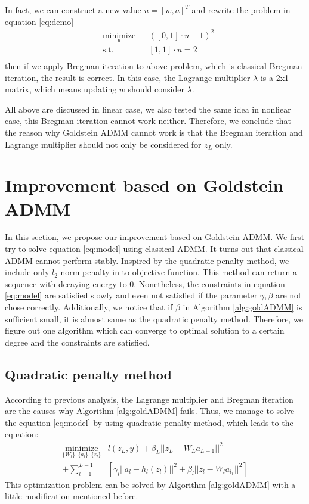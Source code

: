 \documentclass[letterpaper, 10 pt, conference]{ieeeconf}  %
\begin{document}
In fact, we can construct a new value $u = [w,a]^T$ and rewrite the problem in equation \eqref{eq:demo}
\begin{equation}
\begin{aligned}
& \underset{u}{\text{minimize}}  & & ([0,1]\cdot u-1)^2 \\
& \text{s.t.} & & [1,1] \cdot u = 2\\
\end{aligned}
\end{equation}
then if we apply Bregman iteration to above problem, which is classical Bregman iteration, the result is correct. In this case, the Lagrange multiplier $\lambda$ is a 2x1 matrix, which means updating $w$ should consider $\lambda$.

All above are discussed in linear case, we also tested the same idea in nonliear case, this Bregman iteration cannot work neither. Therefore, we conclude that the reason why Goldstein ADMM cannot work is that the Bregman iteration and Lagrange multiplier should not only be considered for $z_L$ only.

\section{Improvement based on Goldstein ADMM} \label{improvement}
In this section, we propose our improvement based on Goldstein ADMM. We first try to solve equation \eqref{eq:model} using classical ADMM. It turns out that classical ADMM cannot perform stably. Inspired by the quadratic penalty method, we include only $l_2$ norm penalty in to objective function. This method can return a sequence with decaying energy to 0. Nonetheless, the constraints in equation \eqref{eq:model} are satisfied slowly and even not satisfied if the parameter $\gamma, \beta$ are not chose correctly. Additionally, we notice that if $\beta$ in Algorithm \ref{alg:goldADMM} is sufficient small, it is almost same as the quadratic penalty method. Therefore, we figure out one algorithm which can converge to optimal solution to a certain degree and the constraints are satisfied.

\subsection{Quadratic penalty method}
According to previous analysis, the Lagrange multiplier and Bregman iteration are the causes why Algorithm \ref{alg:goldADMM} fails. Thus, we manage to solve the equation \eqref{eq:model} by using quadratic penalty method, which leads to the equation:
\begin{equation}
\begin{aligned}
\underset{\{W_l\},\{a_l\}, \{z_l\}}{\text{minimize}} 
& l(z_L,y) + \beta_L||z_L -W_La_{L-1}||^2 \\
+ \sum_{l=1}^{L-1}&[\gamma_l||a_l - h_l(z_l)||^2 + \beta_l||z_l - W_la_{l_1}||^2]
\label{eq:quadratic_only}
\end{aligned}
\end{equation}
This optimization problem can be solved by Algorithm \ref{alg:goldADMM} with a little modification mentioned before.
\end{document}
